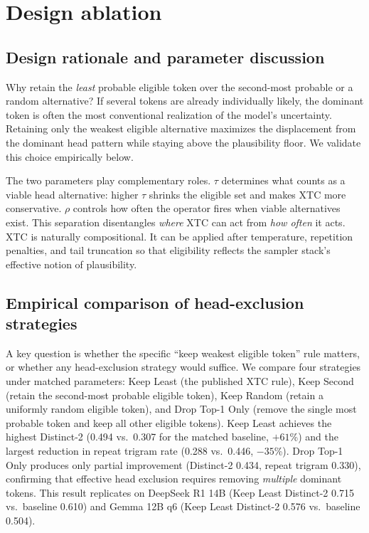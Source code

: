 \documentclass{article}
\newcommand{\xtc}{\textsc{XTC}}
\begin{document}
\section{Design ablation}
\label{app:design_ablation}

\subsection{Design rationale and parameter discussion}
\label{app:design_rationale}

Why retain the \emph{least} probable eligible token over the second-most probable or a random alternative?
If several tokens are already individually likely, the dominant token is often the most conventional realization of the model's uncertainty.
Retaining only the weakest eligible alternative maximizes the displacement from the dominant head pattern while staying above the plausibility floor.
We validate this choice empirically below.

The two parameters play complementary roles.
$\tau$ determines what counts as a viable head alternative: higher $\tau$ shrinks the eligible set and makes \xtc{} more conservative.
$\rho$ controls how often the operator fires when viable alternatives exist.
This separation disentangles \emph{where} \xtc{} can act from \emph{how often} it acts.
\xtc{} is naturally compositional. It can be applied after temperature, repetition penalties, and tail truncation so that eligibility reflects the sampler stack's effective notion of plausibility.

\subsection{Empirical comparison of head-exclusion strategies}

A key question is whether the specific ``keep weakest eligible token'' rule matters, or whether any head-exclusion strategy would suffice.
We compare four strategies under matched parameters: Keep Least (the published \xtc{} rule), Keep Second (retain the second-most probable eligible token), Keep Random (retain a uniformly random eligible token), and Drop Top-1 Only (remove the single most probable token and keep all other eligible tokens).
Keep Least achieves the highest Distinct-2 (0.494 vs.\ 0.307 for the matched baseline, $+61$\%) and the largest reduction in repeat trigram rate (0.288 vs.\ 0.446, $-35$\%).
Drop Top-1 Only produces only partial improvement (Distinct-2 0.434, repeat trigram 0.330), confirming that effective head exclusion requires removing \emph{multiple} dominant tokens.
This result replicates on DeepSeek R1 14B (Keep Least Distinct-2 0.715 vs.\ baseline 0.610) and Gemma 12B q6 (Keep Least Distinct-2 0.576 vs.\ baseline 0.504).
\end{document}
